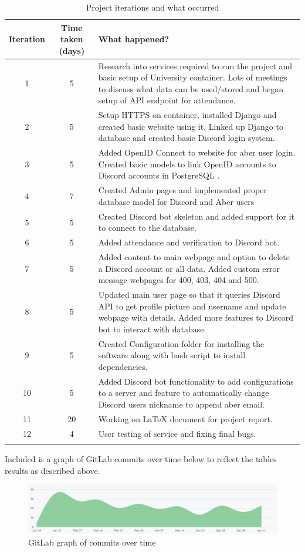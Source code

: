 \begin{longtable}[H]{| c | c | p{9cm} |}
\hline
Iteration & Time taken (days) & What happened? \\
\hline
1 & 5 & Research into services required to run the project and basic setup of University container. Lots of meetings to discuss what data can be used/stored and began setup of API endpoint for attendance. \\
\hline
2 & 5 & Setup HTTPS on container, installed Django \cite{Django} and created basic website using it. Linked up Django to database and created basic Discord login system. \\
\hline
3 & 5 & Added OpenID Connect \cite{OpenID} to website for aber user login. Created basic models to link OpenID accounts to Discord accounts in PostgreSQL \cite{psql}. \\
\hline
4 & 7 & Created Admin pages and implemented proper database model for Discord and Aber users\\
\hline
5 & 5 & Created Discord bot skeleton and added support for it to connect to the database.\\
\hline
6 & 5 & Added attendance and verification to Discord bot. \\
\hline
7 & 5 & Added content to main webpage and option to delete a Discord account or all data. Added custom error message webpages for 400, 403, 404 and 500. \\
\hline
8 & 5 & Updated main user page so that it queries Discord API to get profile picture and username and update webpage with details. Added more features to Discord bot to interact with database.\\
\hline
9 & 5 & Created Configuration folder for installing the software along with bash script to install dependencies.\\
\hline
10 & 5 & Added Discord bot functionality to add configurations to a server and feature to automatically change Discord users nickname to append aber email.\\
\hline
11 & 20 & Working on LaTeX document for project report. \\
\hline
12 & 4 & User testing of service and fixing final bugs. \\
\hline
\caption{Project iterations and what occurred}
\label{tab:project-iterations}
\end{longtable}

Included is a graph of GitLab commits over time below to reflect the tables results as described above. 

\begin{figure}[H]
	\centering
	\includegraphics[width=1\linewidth]{Figures/gitlab-commit-graph.png}
	\caption{GitLab graph of commits over time}
	\label{fig:gitlab-graph}
\end{figure}